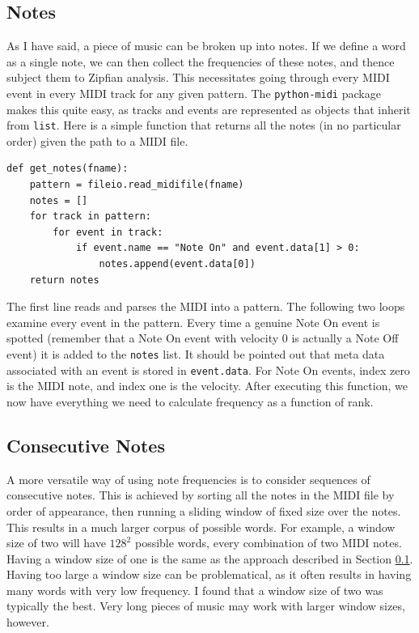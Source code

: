 \documentclass[10pt]{book}
\begin{document}
\subsection{Notes}
\label{sec:note_group}
As I have said, a piece of music can be broken up into notes. If we define a word as a single note, we can then collect the frequencies of these notes, and thence subject them to Zipfian analysis. This necessitates going through every MIDI event in every MIDI track for any given pattern. The \texttt{python-midi} package makes this quite easy, as tracks and events are represented as objects that inherit from \texttt{list}. Here is a simple function that returns all the notes (in no particular order) given the path to a MIDI file.

\begin{verbatim}
def get_notes(fname):
    pattern = fileio.read_midifile(fname)
    notes = []
    for track in pattern:
        for event in track:
            if event.name == "Note On" and event.data[1] > 0:
                notes.append(event.data[0])
    return notes
\end{verbatim}

The first line reads and parses the MIDI into a pattern. The following two loops examine every event in the pattern. Every time a genuine Note On event is spotted (remember that a Note On event with velocity 0 is actually a Note Off event) it is added to the \texttt{notes} list. It should be pointed out that meta data associated with an event is stored in \texttt{event.data}. For Note On events, index zero is the MIDI note, and index one is the velocity. After executing this function, we now have everything we need to calculate frequency as a function of rank.


\subsection{Consecutive Notes}
A more versatile way of using note frequencies is to consider sequences of consecutive notes. This is achieved by sorting all the notes in the MIDI file by order of appearance, then running a sliding window of fixed size over the notes. This results in a much larger corpus of possible words. For example, a window size of two will have $128^2$ possible words, every combination of two MIDI notes. Having a window size of one is the same as the approach described in Section \ref{sec:note_group}. Having too large a window size can be problematical, as it often results in having many words with very low frequency. I found that a window size of two was typically the best. Very long pieces of music may work with larger window sizes, however.
\end{document}
